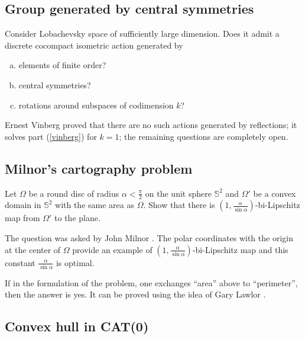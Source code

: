 


\subsection*{Group generated by central symmetries}
\label{Group generated by central symmetries}

\begin{pr}
Consider Lobachevsky space of sufficiently large dimension.
Does it admit a discrete cocompact isometric action generated by 
\begin{enumerate}[(a)]
 \item elements of finite order?
 \item central symmetries?
 \item\label{vinberg} rotations around subspaces of codimension $k$?
\end{enumerate}

\end{pr}

Ernest Vinberg \cite{vinberg, vinberg-strong} proved that there are no such actions generated by reflections;
it solves part (\ref{vinberg}) for $k=1$; the remaining questions are completely open.

\subsection*{Milnor's cartography problem}
\label{Milnor's cartography problem}

\begin{pr}
Let $\Omega$ be a round disc of radius $\alpha<\tfrac\pi2$ on the unit sphere $\mathbb{S}^2$
and $\Omega'$ be a convex domain in $\mathbb{S}^2$ with the same area as $\Omega$. Show that there is $(1,\tfrac{\alpha}{\sin\alpha})$-bi-Lipschitz map from $\Omega'$ to the plane.
\end{pr}

The question was asked by John Milnor \cite{milnor-cartography}.
The polar coordinates with the origin at the center of $\Omega$ provide an example of $(1,\tfrac{\alpha}{\sin\alpha})$-bi-Lipschitz map and this constant $\tfrac{\alpha}{\sin\alpha}$ is optimal.

If in the formulation of the problem, one exchanges ``area''  above to ``perimeter'',
then the answer is yes.
It can be proved using the idea of Gary Lawlor \cite{lawlor}.

\subsection*{Convex hull in CAT(0)}
\label{Convex hull in CAT(0)}

